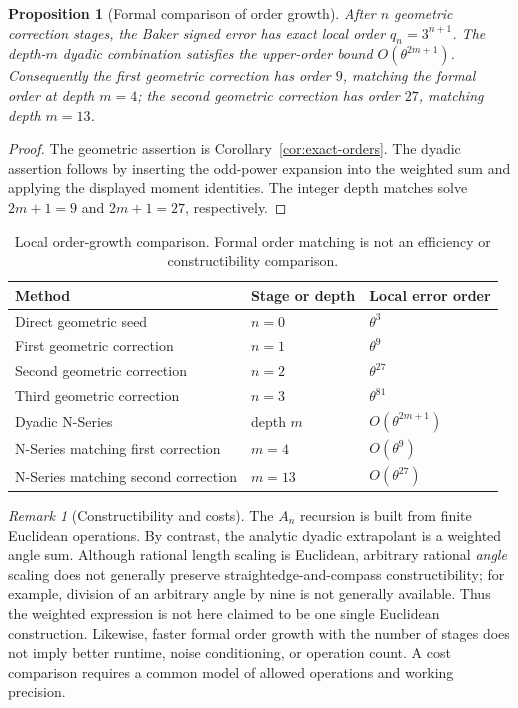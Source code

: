 \documentclass[11pt]{article}
\newtheorem{proposition}{Proposition}
\theoremstyle{remark}
\newtheorem{remark}{Remark}
\begin{document}
\begin{proposition}[Formal comparison of order growth]
\label{prop:nseries-comparison}
After $n$ geometric correction stages, the Baker signed error has exact
local order $q_n=3^{n+1}$. The depth-$m$ dyadic combination satisfies the
upper-order bound $O(\theta^{2m+1})$. Consequently the first geometric
correction has order $9$, matching the formal order at depth $m=4$;
the second geometric correction has order $27$, matching depth $m=13$.
\end{proposition}
\begin{proof}
The geometric assertion is Corollary~\ref{cor:exact-orders}.
The dyadic assertion follows by inserting the odd-power expansion into
the weighted sum and applying the displayed moment identities. The
integer depth matches solve $2m+1=9$ and $2m+1=27$, respectively.
\end{proof}

\begin{table}[ht]
\centering
\begin{tabular}{lll}
\toprule
Method & Stage or depth & Local error order \\
\midrule
Direct geometric seed & $n=0$ & $\theta^3$ \\
First geometric correction & $n=1$ & $\theta^9$ \\
Second geometric correction & $n=2$ & $\theta^{27}$ \\
Third geometric correction & $n=3$ & $\theta^{81}$ \\
Dyadic N-Series & depth $m$ & $O(\theta^{2m+1})$ \\
N-Series matching first correction & $m=4$ & $O(\theta^9)$ \\
N-Series matching second correction & $m=13$ & $O(\theta^{27})$ \\
\bottomrule
\end{tabular}
\caption{Local order-growth comparison. Formal order matching is not an
efficiency or constructibility comparison.}
\end{table}

\begin{remark}[Constructibility and costs]
The $A_n$ recursion is built from finite Euclidean operations. By
contrast, the analytic dyadic extrapolant is a weighted angle sum.
Although rational length scaling is Euclidean, arbitrary rational
\emph{angle} scaling does not generally preserve straightedge-and-compass
constructibility; for example, division of an arbitrary angle by nine
is not generally available. Thus the weighted expression is not here
claimed to be one single Euclidean construction. Likewise, faster
formal order growth with the number of stages does not imply better
runtime, noise conditioning, or operation count. A cost comparison
requires a common model of allowed operations and working precision.
\end{remark}
\end{document}
